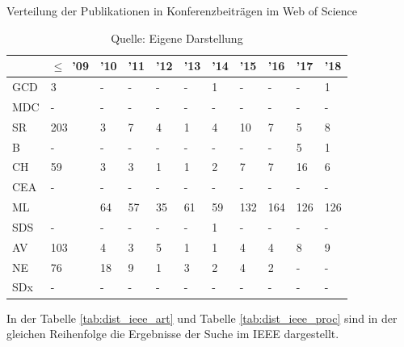 \begin{table}
\caption{Verteilung der Publikationen in Konferenzbeiträgen im \glqq Web of Science\grqq}
\centering
\label{tab:dist_wos_proc}
\begin{tabularx}{\linewidth}{X|X|X|X|X|X|X|X|X|X|X}
	& $\leq$~'09 & '10 & '11 & '12 & '13 & '14 & '15 & '16 & '17 & '18 \\
	\hline
	GCD & 3 & - & - & - & - & 1 & - & - & - & 1 \\
	\hline
	MDC & - & - & - & - & - & - & - & - & - & - \\
	\hline
	SR & 203 & 3 & 7 & 4 & 1 & 4 & 10 & 7 & 5 & 8 \\
	\hline
	B & - & - & - & - & - & - & - & - & 5 & 1 \\
	\hline
	CH & 59 & 3 & 3 & 1 & 1 & 2 & 7 & 7 & 16 & 6 \\
	\hline
	CEA & - & - & - & - & - & - & - & - & - & - \\
	\hline
	ML & \numprint{2042} & 64 & 57 & 35 & 61 & 59 & 132 & 164 & 126 & 126 \\
	\hline
	SDS & - & - & - & - & - & 1 & - & - & - & - \\
	\hline
	AV & 103 & 4 & 3 & 5 & 1 & 1 & 4 & 4 & 8 & 9 \\
	\hline
	NE & 76 & 18 & 9 & 1 & 3 & 2 & 4 & 2 & - & - \\
	\hline
	SDx & - & - & - & - & - & - & - & - & - & - \\
\end{tabularx}
\caption*{Quelle: Eigene Darstellung}
\end{table}

In der Tabelle \ref{tab:dist_ieee_art} und Tabelle \ref{tab:dist_ieee_proc} sind in der gleichen Reihenfolge die Ergebnisse der Suche im IEEE dargestellt.

